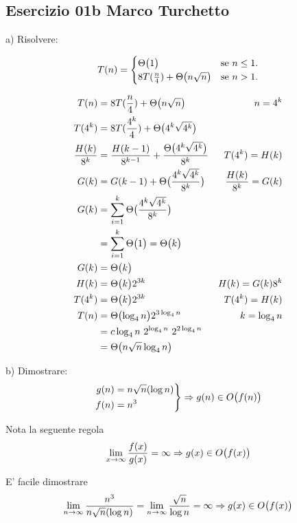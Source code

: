 
\subsection[01b MT]{Esercizio 01b Marco Turchetto}

a) Risolvere:

\begin{equation}
	T(n)=\begin{cases}
		\Theta\bigl(1\bigr)							            & \text{se $n \leq 1$}.\\
		\text{$8T( \frac{n}{4} ) + \Theta\bigl(n \sqrt{n}\bigr) $} & \text{se $n > 1$}.
 	\end{cases}
\end{equation}

\begin{align*}
	T(n) &= 8T(\frac{n}{4}) + \Theta\bigl( n \sqrt{n}\bigr)  & n = 4^k \\
	T(4^k) &= 8T(\frac{4^k}{4}) + \Theta\bigl(4^k \sqrt{4^k}\bigr) \\
	\frac{H(k)}{8^k} &= \frac{H(k-1)}{8^{k-1}} + \frac{\Theta\bigl(4^k \sqrt{4^k}\bigr)}{8^k} & T(4^k) = H(k) \\
	G(k) &= G(k-1) + \Theta\bigl(\frac{4^k \sqrt{4^k}}{8^k}\bigr) & \frac{H(k)}{8^k} = G(k)\\
	G(k) &= \sum _{i=1} ^{k} \Theta\bigl(\frac{4^k \sqrt{4^k}}{8^k}\bigr) \\
	     &= \sum _{i=1} ^{k} \Theta\bigl(1\bigr) = \Theta\bigl(k\bigr) \\
	G(k) &= \Theta\bigl(k\bigr) \\
	H(k) &= \Theta\bigl(k\bigr) 2^{3k} & H(k) = G(k) 8^k\\
	T(4^k) &= \Theta\bigl(k\bigr) 2^{3k} & T(4^k) = H(k) \\
	T(n) &= \Theta\bigl(\log _4 n\bigr) 2^{3 \log_4 n} & k= \log_4 n \\ 
	     &= c \log _4 n \ 2^{\log_4 n} \ 2 ^ {2 \log _ 4 n} \\
	     &= \Theta\bigl(n \sqrt{n} \log_4 n\bigr)
\end{align*}

b) Dimostrare:
\begin{equation*}
\left.
	\begin{aligned}
		g(n) &= n \sqrt{n}(\log n) \\
		f(n) &= n^3
	\end{aligned}
\right \} \Rightarrow  g(n) \in O\bigl(f(n)\bigr) 
\end{equation*}

Nota la seguente regola
\begin{equation*}
	\lim _{x \to \infty} \frac{f(x)}{g(x)} = \infty \Rightarrow g(x) \in O\bigl(f(x)\bigr)
\end{equation*}

E' facile dimostrare
\begin{align*}
	\lim _{n \to \infty} \frac{n^3}{n \sqrt{n}(\log n)} = \lim _{n \to \infty} \frac{\sqrt{n}}{ \log n} = \infty \Rightarrow g(x) \in O\bigl(f(x)\bigr)
\end{align*}